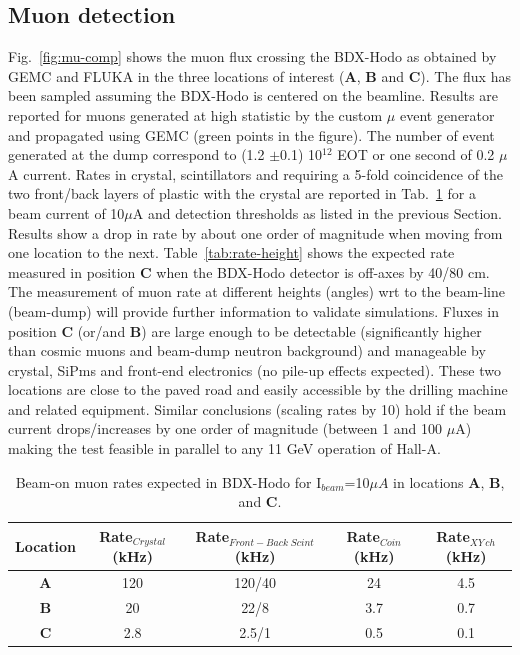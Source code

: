 \subsection{Muon detection} 
Fig.~\ref{fig:mu-comp} shows the muon flux crossing the BDX-Hodo  as obtained by GEMC and FLUKA  in the  three locations of interest ({\bf A}, {\bf B} and {\bf C}).
The flux has been sampled assuming the BDX-Hodo is centered on the beamline.
Results are reported for muons generated at high statistic by the custom $\mu$ event generator and propagated using GEMC (green points in the figure).
The number of event generated at the dump correspond to  (1.2 $\pm$0.1) 10$^{12}$ EOT or one second of 0.2 $\mu$A current.
Rates in crystal, scintillators and  requiring a 5-fold coincidence of the two front/back layers of plastic with  the crystal are reported in Tab.~\ref{tab:rate} for a beam current of 10$\mu$A and detection thresholds as listed in the previous Section. Results show a drop in rate by about one order of magnitude when moving from one location to the next. 
Table~\ref{tab:rate-height}  shows the expected rate measured in  position {\bf C}  when the BDX-Hodo detector is off-axes by 40/80 cm. The measurement of muon rate at different heights (angles) wrt to the beam-line (beam-dump) will provide further information to validate simulations.  
Fluxes in position {\bf C} (or/and {\bf B}) are large enough to be detectable (significantly higher than cosmic muons and beam-dump neutron background) and manageable  by crystal, SiPms and front-end electronics (no pile-up effects expected). These two locations are close to the paved road and easily accessible by the drilling machine and related equipment. Similar conclusions (scaling rates by 10) hold  if the beam current drops/increases by one order of magnitude (between 1 and 100 $\mu$A) making the test feasible in parallel to any 11 GeV operation of Hall-A.

\begin{table}[htp]
\caption{Beam-on muon rates expected in BDX-Hodo for I$_{beam}$=10$\mu A$ in locations {\bf A}, {\bf B},  and {\bf C}.}
\begin{center}
\begin{tabular}{|c|c|c|c|c|}
\hline
Location & Rate$_{Crystal}$  (kHz)&  Rate$_{Front-Back \;Scint} $(kHz) & Rate$_{Coin}$ (kHz) & Rate$_{XY\, ch} $(kHz)\\
\hline\hline
{\bf A}  & 120  &120/40    & 24 &4.5 \\
 \hline
{\bf B} & 20 &  22/8 & 3.7 & 0.7\\
 \hline
{\bf C} & 2.8 &  2.5/1 & 0.5 & 0.1 \\
\hline\hline
\end{tabular}
\end{center}
\label{tab:rate}
\end{table}%

